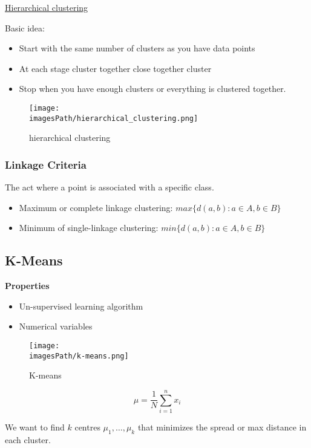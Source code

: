 \documentclass{article}
\newcommand{\imagesPath}{images}
\begin{document}
\href{https://www.youtube.com/watch?v=7xHsRkOdVwo}{Hierarchical clustering}

Basic idea:
\begin{itemize}
    \item Start with the same number of clusters as you have data points
    \item At each stage cluster together close together cluster 
    \item Stop when you have enough clusters or everything is clustered together.
\end{itemize}

\begin{figure}[!h]
    \centering
    \texttt{[image: \\imagesPath/hierarchical\_clustering.png]}
    \caption{hierarchical clustering}
\end{figure}

\subsubsection{Linkage Criteria}
The act where a point is associated with a specific class.
\begin{itemize}
    \item Maximum or complete linkage clustering:
    $max\{ d(a,b): a\in A, b\in B\}$
    \item Minimum of single-linkage clustering:
    $min\{ d(a,b): a\in A, b\in B\}$
\end{itemize}

\subsection{K-Means}
\textbf{Properties}
\begin{itemize}
    \item Un-supervised learning algorithm
    \item Numerical variables 
\end{itemize}
\begin{figure}[!h]
    \centering
    \texttt{[image: \\imagesPath/k-means.png]}
    \caption{K-means}
\end{figure}

\begin{equation*}
    \mu = \frac{1}{N} \sum_{i=1}^{n} x_i
\end{equation*}

We want to find $k$ centres $\mu_1,\ldots,\mu_k$ that minimizes the spread or max 
distance in each cluster. 
\end{document}
